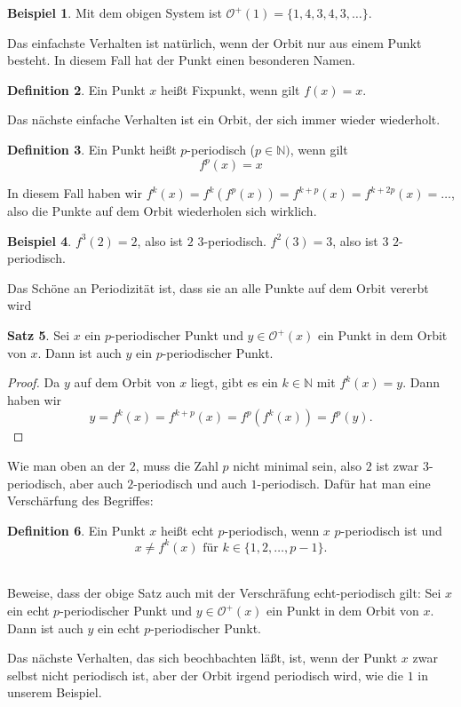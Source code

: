 \documentclass[a4paper,ngerman,12pt]{zirkelblatt1415}
\theoremstyle{definition}
\newtheorem{definition}{Definition}
\newtheorem{satz}[definition]{Satz}
\newtheorem{beispiel}[definition]{Beispiel}
\theoremstyle{remark}
\begin{document}
\begin{beispiel}
Mit dem obigen System ist $\mathcal{O}^+(1) = \{1,4,3,4,3,\ldots\}$.
\end{beispiel}
Das einfachste Verhalten ist natürlich, wenn der Orbit nur aus einem Punkt besteht. In diesem Fall hat der Punkt einen besonderen Namen.
\begin{definition}
Ein Punkt $x$ heißt Fixpunkt, wenn gilt $f(x) =x$.
\end{definition}
Das nächste einfache Verhalten ist ein Orbit, der sich immer wieder wiederholt.
\begin{definition}
Ein Punkt heißt $p$-periodisch ($p\in\mathbb{N})$, wenn gilt
\[ 
f^p(x) =x 
\] 
\end{definition}
In diesem Fall haben wir $f^k(x) = f^k\left(f^p(x)\right) = f^{k+p} (x) = f^{k+2p} (x) = \ldots$, also die Punkte auf dem Orbit wiederholen sich wirklich. 
\begin{beispiel}
$f^{3}(2) = 2$, also ist $2$ $3$-periodisch. $f^2(3) = 3$, also ist $3$ $2$-periodisch. 
\end{beispiel}
Das Schöne an Periodizität ist, dass sie an alle Punkte auf dem Orbit vererbt wird
\begin{satz}
Sei $x$ ein $p$-periodischer Punkt und $y\in\mathcal{O}^+(x)$ ein Punkt in dem Orbit von $x$. Dann ist auch $y$ ein $p$-periodischer Punkt. 
\end{satz}
\begin{proof}
Da $y$ auf dem Orbit von $x$ liegt, gibt es ein $k\in\mathbb{N}$ mit $f^k(x) =y$. Dann haben wir 
\[
 y = f^k(x) = f^{k+p} (x) = f^{p}\left(f^{k}(x) \right) = f^p(y).
\]
\end{proof}
Wie man oben an der $2$, muss die Zahl $p$ nicht minimal sein, also $2$ ist zwar $3$-periodisch, aber auch $2$-periodisch und auch $1$-periodisch. Dafür hat man eine Verschärfung des Begriffes:
\begin{definition}
Ein Punkt $x$ heißt echt $p$-periodisch, wenn $x$ $p$-periodisch ist und 
\[
x\neq f^k(x) \text{ für } k\in\{1,2,\ldots, p-1\}.
\]
\end{definition}
\begin{aufgabe}\\
Beweise, dass der obige Satz auch mit der Verschräfung echt-periodisch gilt:
Sei $x$ ein echt $p$-periodischer Punkt und $y\in\mathcal{O}^+(x)$ ein Punkt in dem Orbit von $x$. Dann ist auch $y$ ein echt $p$-periodischer Punkt. 
\end{aufgabe}
Das nächste Verhalten, das sich beochbachten läßt, ist, wenn der Punkt $x$ zwar selbst nicht periodisch ist, aber der Orbit irgend periodisch wird, wie die $1$ in unserem Beispiel.
\end{document}
